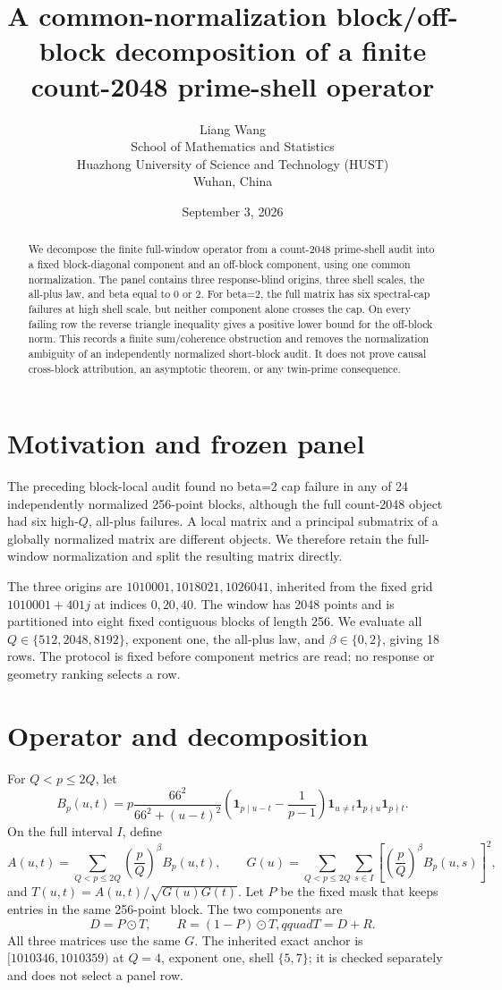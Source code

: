 \documentclass[10pt]{article}
\title{A common-normalization block/off-block decomposition of a finite\newline
count-2048 prime-shell operator}
\author{Liang Wang\\
School of Mathematics and Statistics\\
Huazhong University of Science and Technology (HUST)\\
Wuhan, China}
\date{September 3, 2026}
\begin{document}
\maketitle

\begin{abstract}
We decompose the finite full-window operator from a count-2048 prime-shell
audit into a fixed block-diagonal component and an off-block component, using
one common normalization.  The panel contains three response-blind origins,
three shell scales, the all-plus law, and beta equal to 0 or 2.  For beta=2,
the full matrix has six spectral-cap failures at high shell scale, but neither
component alone crosses the cap.  On every failing row the reverse triangle
inequality gives a positive lower bound for the off-block norm.  This records
a finite sum/coherence obstruction and removes the normalization ambiguity of
an independently normalized short-block audit.  It does not prove causal
cross-block attribution, an asymptotic theorem, or any twin-prime consequence.
\end{abstract}

\section{Motivation and frozen panel}

The preceding block-local audit found no beta=2 cap failure in any of 24
independently normalized 256-point blocks, although the full count-2048
object had six high-\(Q\), all-plus failures.  A local matrix and a principal
submatrix of a globally normalized matrix are different objects.  We therefore
retain the full-window normalization and split the resulting matrix directly.

The three origins are \(1010001,1018021,1026041\), inherited from the fixed
grid \(1010001+401j\) at indices \(0,20,40\).  The window has 2048 points and
is partitioned into eight fixed contiguous blocks of length 256.  We evaluate
all \(Q\in\{512,2048,8192\}\), exponent one, the all-plus law, and
\(\beta\in\{0,2\}\), giving 18 rows.  The protocol is fixed before component
metrics are read; no response or geometry ranking selects a row.

\section{Operator and decomposition}

For \(Q<p\leq2Q\), let
\[
 B_p(u,t)=p\frac{66^2}{66^2+(u-t)^2}
 \left(\mathbf 1_{p\mid u-t}-\frac{1}{p-1}\right)
 \mathbf 1_{u\ne t}\mathbf 1_{p\nmid u}\mathbf 1_{p\nmid t}.
\]
On the full interval \(I\), define
\[
 A(u,t)=\sum_{Q<p\leq2Q}\left(\frac pQ\right)^\beta B_p(u,t),
 \qquad
 G(u)=\sum_{Q<p\leq2Q}\sum_{s\in I}
 \left[\left(\frac pQ\right)^\beta B_p(u,s)\right]^2,
\]
and \(T(u,t)=A(u,t)/\sqrt{G(u)G(t)}\).  Let \(P\) be the fixed mask that
keeps entries in the same 256-point block.  The two components are
\[
 D=P\odot T,\qquad R=(1-P)\odot T,qquad T=D+R.
\]
All three matrices use the same \(G\).  The inherited exact anchor is
\([1010346,1010359)\) at \(Q=4\), exponent one, shell \(\{5,7\}\); it is
checked separately and does not select a panel row.
\end{document}
